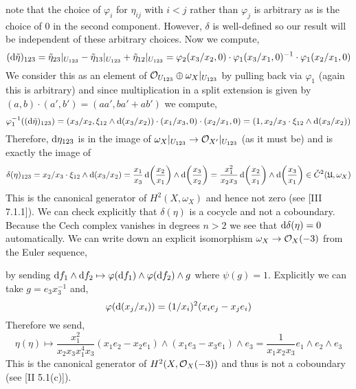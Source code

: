 \documentclass[12pt]{article}
\begin{document}
note that the choice of $\varphi_i$ for $\eta_{ij}$ with $i < j$ rather than $\varphi_j$ is arbitrary as is the choice of $0$ in the second component. However, $\delta$ is well-defined so our result will be independent of these arbitrary choices. Now we compute,
\[ (\mathrm{d}{\tilde{\eta}})_{123} = \tilde{\eta}_{23}|_{U_{123}} - \tilde{\eta}_{13} |_{U_{123}} + \tilde{\eta}_{12}|_{U_{123}} = \varphi_2(x_3/x_2, 0) \cdot \varphi_1(x_3/x_1, 0)^{-1} \cdot \varphi_1(x_2/x_1, 0) \]
We consider this as an element of $\mathcal{O}_{U_{123}} \oplus \omega_X|_{U_{123}}$ by pulling back via $\varphi_1$ (again this is arbitrary) and since multiplication in a split extension is given by $(a,b) \cdot (a', b') = (aa', ba' + a b')$ we compute,
\[ \varphi_{1}^{-1}((\mathrm{d}{\tilde{\eta}})_{123}) = (x_3/x_2, \xi_{12} \wedge \mathrm{d}{(x_3/x_2)}) \cdot (x_1/x_3, 0) \cdot (x_2/x_1, 0) = (1, x_2/ x_3 \cdot \xi_{12} \wedge \mathrm{d}{(x_3/x_2)}) \]
Therefore, $\mathrm{d}{\eta}_{123}$ is in the image of $\omega_X|_{U_{123}} \to \mathcal{O}_{X'}|_{U_{123}}$ (as it must be) and is exactly the image of
\[ \delta(\eta)_{123} = x_2/x_3 \cdot \xi_{12} \wedge \mathrm{d}{(x_3/x_2)} = \frac{x_1}{x_3} \, \mathrm{d}{\left( \frac{x_2}{x_1} \right)} \wedge \mathrm{d}{\left( \frac{x_3}{x_2} \right)} = \frac{x_1^2}{x_2 x_3} \, \mathrm{d}{\left( \frac{x_2}{x_1} \right)} \wedge \mathrm{d}{\left( \frac{x_3}{x_1} \right)} \in \check{C}^2(\mathfrak{U}, \omega_X) \]
This is the canonical generator of $H^2(X, \omega_X)$ and hence not zero (see [III 7.1.1]).
We can check explicitly that $\delta(\eta)$ is a cocycle and not a coboundary. Because the Cech complex vanishes in degrees $n > 2$ we see that $\mathrm{d}{\delta(\eta)} = 0$ automatically. We can write down an explicit isomorphism $\omega_X \to \mathcal{O}_{X}(-3)$ from the Euler sequence,
\begin{center}
\end{center}
by sending $\mathrm{d}{f_1} \wedge \mathrm{d}{f_2} \mapsto \varphi(\mathrm{d}{f_1}) \wedge \varphi(\mathrm{d}{f_2}) \wedge g$ where $\psi(g) = 1$. Explicitly we can take $g = e_3 x_3^{-1}$ and,
\[ \varphi(\mathrm{d}{(x_j/x_i)}) = (1/x_i)^2 (x_i e_j - x_j e_i) \]
Therefore we send,
\[ \eta(\eta) \mapsto \frac{x_1^2}{x_2 x_3 x_1^4 x_3} (x_1 e_2 - x_2 e_1) \wedge (x_1 e_3 - x_3 e_1) \wedge e_3 = \frac{1}{x_1 x_2 x_3} e_1 \wedge e_2 \wedge e_3 \] 
This is the canonical generator of $H^2(X, \mathcal{O}_{X}(-3))$ and thus is not a coboundary (see [II 5.1(c)]).
\end{document}
